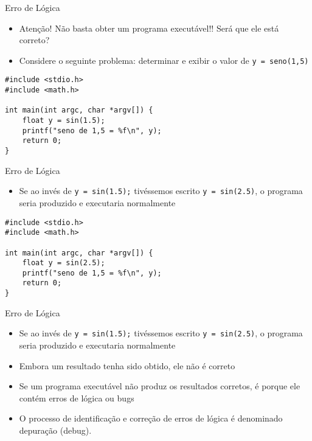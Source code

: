 \documentclass[t, aspectratio=169]{beamer}
\begin{document}
\begin{frame}[label={sec:orgce01039},fragile]{Erro de Lógica}
 \begin{itemize}
\item \alert{Atenção!} Não basta obter um programa executável!! Será que ele está correto?
\item Considere o seguinte problema: determinar e exibir o valor de \texttt{y = seno(1,5)}
\end{itemize}
\begin{verbatim}
#include <stdio.h>
#include <math.h>

int main(int argc, char *argv[]) {
    float y = sin(1.5);
    printf("seno de 1,5 = %f\n", y);
    return 0;
}
\end{verbatim}
\end{frame}

\begin{frame}[label={sec:org05951be},fragile]{Erro de Lógica}
 \begin{itemize}
\item Se ao invés de \texttt{y = sin(1.5);} tivéssemos escrito \texttt{y = sin(2.5)}, o programa seria produzido e executaria normalmente
\end{itemize}
\begin{verbatim}
#include <stdio.h>
#include <math.h>

int main(int argc, char *argv[]) {
    float y = sin(2.5);
    printf("seno de 1,5 = %f\n", y);
    return 0;
}
\end{verbatim}
\end{frame}

\begin{frame}[label={sec:org8f2d83d},fragile]{Erro de Lógica}
 \begin{itemize}
\item Se ao invés de \texttt{y = sin(1.5);} tivéssemos escrito \texttt{y = sin(2.5)}, o programa seria produzido e executaria normalmente
\item Embora um resultado tenha sido obtido, ele \alert{não é correto}
\item Se um programa executável não produz os resultados corretos, é porque ele contém \alert{erros de lógica} ou \alert{bugs}
\item O processo de identificação e correção de erros de lógica é denominado \alert{depuração} (\alert{debug}).
\end{itemize}
\end{frame}
\end{document}
